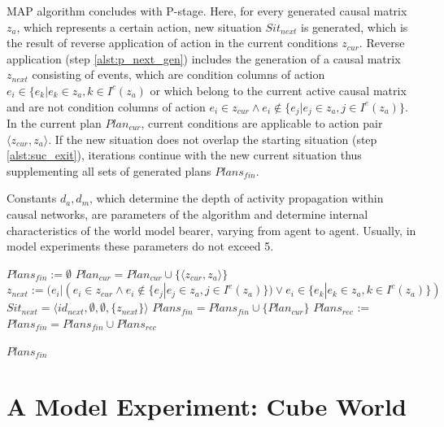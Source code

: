 \documentclass[review]{elsarticle}
\begin{document}
MAP algorithm concludes with P-stage. Here, for every generated causal matrix $z_a$, which represents a certain action, new situation $Sit_{next}$ is generated, which is the result of reverse application of action in the current conditions $z_{cur}$. Reverse application (step \ref{alst:p_next_gen}) includes the generation of a causal matrix $z_{next}$ consisting of events, which are condition columns of action $e_i\in\{e_k|e_k\in z_a, k\in I^c(z_a)$ or which belong to the current active causal matrix and are not condition columns of action $e_i\in z_{cur} \land e_i\not\in\{e_j|e_j\in z_a, j\in I^e(z_a)\}$. In the current plan $Plan_{cur}$, current conditions are applicable to action pair $\langle z_{cur}, z_a\rangle$. If the new situation does not overlap the starting situation (step \ref{alst:suc_exit}), iterations continue with the new current situation thus supplementing all sets of generated plans $Plans_{fin}$.

Constants $d_a, d_m$, which determine the depth of activity propagation within causal networks, are parameters of the algorithm and determine internal characteristics of the world model bearer, varying from agent to agent. Usually, in model experiments these parameters do not exceed 5. 

\begin{algorithm}
	\begin{algorithmic}[1]
			\Statex{}
			\State $Plans_{fin} := \emptyset$
			\State $Plan_{cur} = Plan_{cur}\cup\{\langle z_{cur}, z_a\rangle\}$
			\Statex{} 		
			\State $z_{next} := (e_i|(e_i\in z_{cur} \land e_i\not\in\{e_j|e_j\in z_a, j\in I^e(z_a)\}) \lor e_i\in\{e_k|e_k\in z_a, k\in I^c(z_a)\})$\label{alst:p_next_gen}
			\State $Sit_{next} = \langle id_{next}, \emptyset, \emptyset, \{z_{next}\} \rangle$
			\label{alst:suc_exit}
			\State $Plans_{fin} = Plans_{fin}\cup\{Plan_{cur}\}$
			\Else
			\State $Plans_{rec}$ := 
			\State $Plans_{fin} = Plans_{fin}\cup Plans_{rec}$
			\EndIf
			\EndFor
			
			\State\Return $Plans_{fin}$
			\EndFunction
	\end{algorithmic}
\end{algorithm}

\section{A Model Experiment: Cube World}\label{sec:example}
\end{document}
